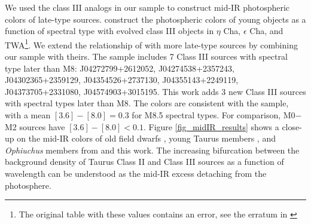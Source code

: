 We used the class III analogs in our sample to construct mid-IR photospheric colors of late-type sources.  \citet{2010ApJS..186..111L} construct the photospheric colors of young objects as a function of spectral type with evolved class III objects in $\eta$ Cha, $\epsilon$ Cha, and TWA\footnote{The original table with these values contains an error, see the erratum in \cite{2010ApJS..189..353L}}.  We extend the relationship of \citet{2010ApJS..186..111L} with more late-type sources by combining our sample with theirs.  The \citet{2010ApJS..189..353L} sample includes 7 Class III sources with spectral type later than M8: J04272799+2612052, J04274538+2357243, J04302365+2359129, J04354526+2737130, J04355143+2249119, J04373705+2331080, J04574903+3015195.  This work adds 3 new Class III sources with spectral types later than M8.  The colors are consistent with the \citet{2010ApJS..189..353L} sample, with a mean $[3.6]-[8.0]=0.3$ for M8.5 spectral types.  For comparison, M0$-$M2 sources have $[3.6]-[8.0]<0.1$.    Figure \ref{fig_midIR_results} shows a close-up on the mid-IR colors of old field dwarfs \citep{2006ApJ...651..502P}, young Taurus members \citep{2010ApJS..186..111L}, and \emph{Ophiuchus} members from \citep{allers06} and this work.  The increasing bifurcation between the background density of Taurus Class II and Class III sources as a function of wavelength can be understood as the mid-IR excess detaching from the photosphere.


